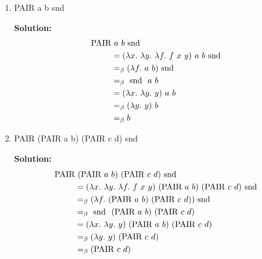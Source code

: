 \documentclass[11pt]{report}
\begin{document}
\begin{enumerate}
\begin{enumerate}
			\item PAIR a b snd 
			
			{\bf Solution:}
			\begin{align*}
				\PAIR & \ a \ b \ \snd \\
				&= (\lambda x. \ \lambda y. \ \lambda f. \ f \ x \ y) \ a \ b \ \snd \\
				&\beq (\lambda f. \ a \ b) \ \snd \\
				&\beq \ \snd \ a \ b \\
				&= (\lambda x. \ \lambda y. \ y) \ a \ b \\
				&\beq (\lambda y. \ y) \ b \\
				&\beq b
			\end{align*}

			\item PAIR (PAIR a b) (PAIR c d) snd
			
			{\bf Solution:}
			\begin{align*}
				\PAIR &\ (\PAIR \ a \ b) \ (\PAIR \ c \ d) \ \snd \\
				&= (\lambda x. \ \lambda y. \ \lambda f. \ f \ x \ y) \ (\PAIR \ a \ b) \ (\PAIR \ c \ d) \ \snd \\
				&\beq (\lambda f. \ (\PAIR \ a \ b) \ (\PAIR \ c \ d)) \ \snd \\
				&\beq \ \snd \ (\PAIR \ a \ b) \ (\PAIR \ c \ d) \\
				&= (\lambda x. \ \lambda y. \ y) \ (\PAIR \ a \ b) \ (\PAIR \ c \ d) \\
				&\beq (\lambda y. \ y) \ (\PAIR \ c \ d) \\
				&\beq (\PAIR \ c \ d)
			\end{align*}

		\end{enumerate}


\end{enumerate}
\end{document}
